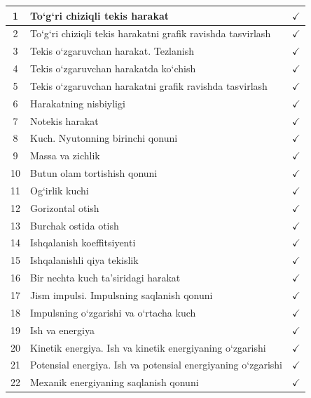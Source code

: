 \begin{table}[h]
    \centering
    \begin{tabular}{|c|p{13cm}|c|}
        \hline
        1 & To‘g‘ri chiziqli tekis harakat & $\checkmark$ \\ \hline
        2 & To‘g‘ri chiziqli tekis harakatni grafik ravishda tasvirlash   & $\checkmark$\\ \hline
        3 & Tekis o`zgaruvchan harakat. Tezlanish & $\checkmark$ \\ \hline
        4 & Tekis o‘zgaruvchan harakatda ko‘chish   & $\checkmark$\\ \hline
        5 &   Tekis o‘zgaruvchan harakatni grafik ravishda tasvirlash & $\checkmark$\\ \hline
        6 &  Harakatning nisbiyligi  & $\checkmark$\\ \hline
        7 & Notekis harakat   & $\checkmark$\\ \hline
        8 & Kuch. Nyutonning birinchi qonuni   & $\checkmark$\\ \hline
        9 & Massa va zichlik   &$\checkmark$ \\ \hline
        10 & Butun olam tortishish qonuni   & $\checkmark$\\ \hline
        11 & Og‘irlik kuchi   &$\checkmark$ \\ \hline
        12 &  Gorizontal otish  & $\checkmark$\\ \hline
        13 & Burchak ostida otish   &$\checkmark$ \\ \hline
        14 & Ishqalanish koeffitsiyenti   & $\checkmark$\\ \hline
        15 & Ishqalanishli qiya tekislik   &$\checkmark$ \\ \hline
        16 & Bir nechta kuch ta’siridagi harakat   & $\checkmark$\\ \hline
        17 &  Jism impulsi. Impulsning saqlanish qonuni  & $\checkmark$\\ \hline
        18 & Impulsning o‘zgarishi va o‘rtacha kuch   &$\checkmark$ \\ \hline
        19 &  Ish va energiya  &$\checkmark$ \\ \hline
        20 &  Kinetik energiya. Ish va kinetik energiyaning o‘zgarishi  &$\checkmark$ \\ \hline
        21 & Potensial energiya. Ish va potensial energiyaning o‘zgarishi   &$\checkmark$ \\ \hline
        22 &  Mexanik energiyaning saqlanish qonuni  &$\checkmark$ \\ \hline

\end{tabular}
\end{table}
